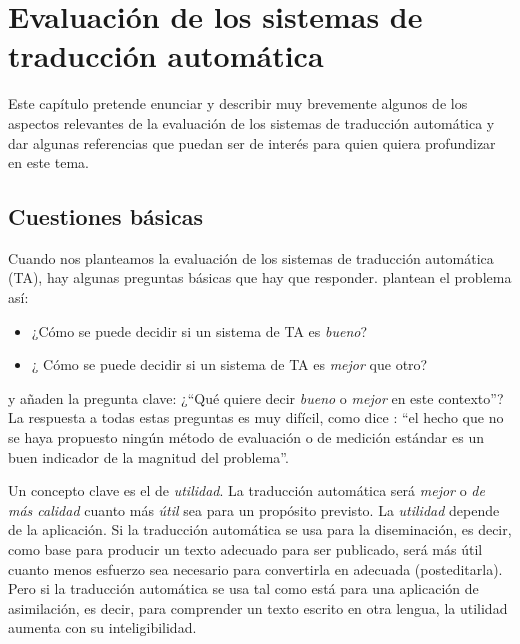 \chapter[Evaluación de los sistemas de TA]{Evaluación de los sistemas de traducción automática} \label{se:ASTA} 

Este capítulo pretende enunciar y describir muy brevemente algunos de los aspectos relevantes de la evaluación de los sistemas de traducción automática y dar algunas referencias que puedan ser de interés para quien quiera profundizar en este tema. 

\section{Cuestiones básicas} Cuando nos planteamos la evaluación de los sistemas de traducción automática (TA), hay algunas preguntas básicas que hay que responder. \citet{arnold94b} plantean el problema así: \begin{itemize} \item¿Cómo se puede decidir si un sistema de TA es \emph{bueno}? \item¿ Cómo se puede decidir si un sistema de TA es \emph{mejor} que otro? \end{itemize} y añaden la pregunta clave: ¿``Qué quiere decir \emph{bueno} o \emph{mejor} en este contexto''? La respuesta a todas estas preguntas es muy difícil, como dice \citet{minnis94j}: ``el hecho que no se haya propuesto ningún método de evaluación o de medición estándar es un buen indicador de la magnitud del problema''. 

Un concepto clave es el de \emph{utilidad}. La traducción automática será \emph{mejor} o \emph{de más calidad} cuanto más \emph{útil} sea para un propósito previsto. La \emph{utilidad} depende de la aplicación. Si la traducción automática se usa para la diseminación, es decir, como base para producir un texto adecuado para ser publicado, será más útil cuanto menos esfuerzo sea necesario para convertirla en adecuada (posteditarla). Pero si la traducción automática se usa tal como está para una aplicación de asimilación, es decir, para comprender un texto escrito en otra lengua, la utilidad aumenta con su inteligibilidad. 

